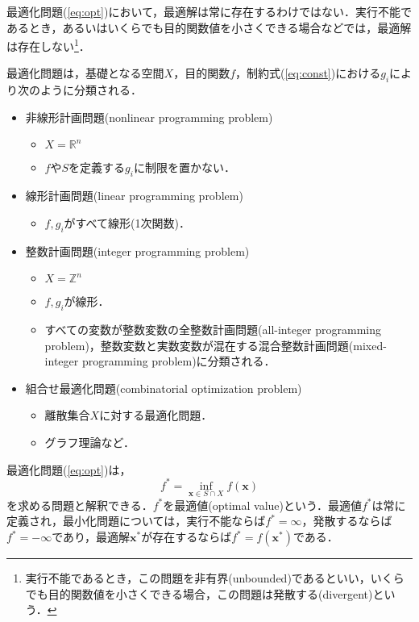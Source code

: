 \documentclass{jsreport}
\begin{document}
最適化問題(\ref{eq:opt})において，最適解は常に存在するわけではない．実行不能であるとき，あるいはいくらでも目的関数値を小さくできる場合などでは，最適解は存在しない\footnote{実行不能であるとき，この問題を非有界(unbounded)であるといい，いくらでも目的関数値を小さくできる場合，この問題は発散する(divergent)という．}．

最適化問題は，基礎となる空間$X$，目的関数$f$，制約式(\ref{eq:const})における$g_i$により次のように分類される．
\begin{itemize}
  \item 非線形計画問題(nonlinear programming problem)
  \begin{itemize}
    \item $X = \mathbb{R}^n$
    \item $f$や$S$を定義する$g_i$に制限を置かない．
  \end{itemize}
  \item 線形計画問題(linear programming problem)
  \begin{itemize}
    \item $f, g_i$がすべて線形(1次関数)．
  \end{itemize}
  \item 整数計画問題(integer programming problem)
  \begin{itemize}
    \item $X = \mathbb{Z}^n$
    \item $f, g_i$が線形．
    \item すべての変数が整数変数の全整数計画問題(all-integer programming problem)，整数変数と実数変数が混在する混合整数計画問題(mixed-integer programming problem)に分類される．
  \end{itemize}
  \item 組合せ最適化問題(combinatorial optimization problem)
  \begin{itemize}
    \item 離散集合$X$に対する最適化問題．
    \item グラフ理論など．
  \end{itemize}
\end{itemize}

最適化問題(\ref{eq:opt})は，
\begin{equation}
  f^* = \inf_{\bm{x} \in S \cap X} f(\bm{x}) \nonumber
\end{equation}
を求める問題と解釈できる．$f^*$を最適値(optimal value)という．最適値$f^*$は常に定義され，最小化問題については，実行不能ならば$f^* = \infty$，発散するならば$f^* = -\infty$であり，最適解$\bm{x}^*$が存在するならば$f^* = f(\bm{x}^*)$である．
\end{document}
